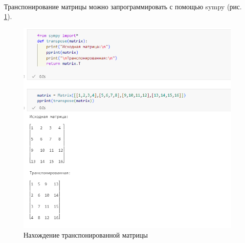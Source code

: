 \documentclass[14pt,a4paper]{extarticle}
\begin{document}
Транспонирование матрицы можно запрограммировать с помощью sympy (рис. \ref{pic:trans}).

\begin{figure}[h!]
    \centering
    \includegraphics[scale=0.7]{pic7/trans.png}
    \caption{Нахождение транспонированной матрицы}
    \label{pic:trans}
\end{figure}
\FloatBarrier
\end{document}
